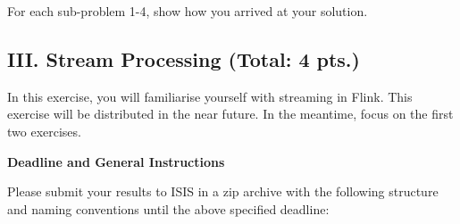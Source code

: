 \documentclass[11pt,a4paper]{article}
\begin{document}
For each sub-problem 1-4, show how you arrived at your solution.


\subsection*{III. Stream Processing (Total: 4 pts.)}
In this exercise, you will familiarise yourself with streaming in Flink. This exercise will be distributed in the near future. In the meantime, focus on the first two exercises.\\ 

\bigskip
\centerline{\textbf{Deadline and General Instructions}}
\bigskip

Please submit your results to ISIS in a zip archive with the following structure and naming conventions until the above specified deadline:

\end{document}
